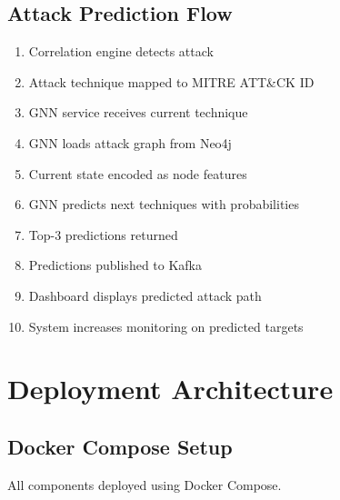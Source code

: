 \documentclass[12pt,a4paper]{article}
\begin{document}
\subsection{Attack Prediction Flow}

\begin{enumerate}[leftmargin=1cm,itemsep=0pt]
    \item Correlation engine detects attack
    \item Attack technique mapped to MITRE ATT\&CK ID
    \item GNN service receives current technique
    \item GNN loads attack graph from Neo4j
    \item Current state encoded as node features
    \item GNN predicts next techniques with probabilities
    \item Top-3 predictions returned
    \item Predictions published to Kafka
    \item Dashboard displays predicted attack path
    \item System increases monitoring on predicted targets
\end{enumerate}


\section{Deployment Architecture}

\subsection{Docker Compose Setup}

All components deployed using Docker Compose.
\end{document}
